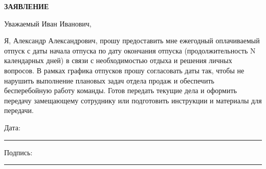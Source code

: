 \documentclass[12pt]{article}
\begin{document}
\begin{center}
\textbf{\LARGE ЗАЯВЛЕНИЕ}
\end{center}

\vspace{1cm}




Уважаемый Иван Иванович,

Я, Александр Александрович, прошу предоставить мне ежегодный оплачиваемый отпуск с даты начала отпуска по дату окончания отпуска (продолжительность N календарных дней) в связи с необходимостью отдыха и решения личных вопросов. В рамках графика отпусков прошу согласовать даты так, чтобы не нарушить выполнение плановых задач отдела продаж и обеспечить бесперебойную работу команды. Готов передать текущие дела и оформить передачу замещающему сотруднику или подготовить инструкции и материалы для передачи.

\vfill

\noindent
Дата: \rule{5cm}{0.4pt} \hfill Подпись: \rule{5cm}{0.4pt}
\end{document}
